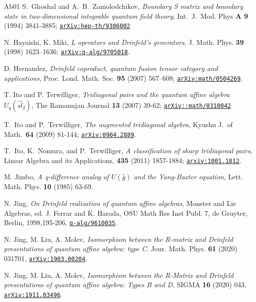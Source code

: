 \documentclass[11pt]{amsart}
\numberwithin{equation}{section}
\numberwithin{equation}{section}
\begin{document}
\begin{thebibliography}{Ab01}
S.\ Ghoshal and A.\ B.\ Zamolodchikov, \textit{Boundary S matrix and boundary state in two-dimensional integrable quantum field theory}, Int.\ J.\ Mod. Phys {\bf A 9} (1994) 3841-3885; \href{https://arxiv.org/abs/hep-th/9306002}{\tt arXiv:hep-th/9306002}

N. Hayaishi, K. Miki, {\it L operators and Drinfeld's generators}, J. Math. Phys. {\bf 39} (1998) 1623--1636;   \href{https://arxiv.org/abs/q-alg/9705018}{\tt arXiv:q-alg/9705018}.

D. Hernandez, {\it Drinfeld coproduct, quantum fusion tensor category and applications}, Proc.
Lond. Math. Soc. {\bf 95} (2007) 567–608;  \href{https://arxiv.org/abs/math/0504269}{\tt arXiv:math/0504269}.


%
T. Ito and P. Terwilliger, {\it Tridiagonal pairs and the quantum affine algebra $U_q(\widehat{sl}_2)$}, The Ramanujan Journal {\bf 13} (2007) 39-62;
\href{https://arxiv.org/abs/math/0310042}{\tt arXiv::math/0310042}

T.\ Ito and P.\ Terwilliger,  \textit{The augmented tridiagonal algebra}, Kyushu J.\ of Math.\ {\bf 64} (2009) 81-144; \href{https://arxiv.org/abs/0904.2889} {\tt arXiv:0904.2889}.

T.\ Ito, K.\ Nomura, and P.\ Terwilliger,  \textit{A classification of sharp tridiagonal pairs}, Linear Algebra and its Applications, {\bf 435} (2011) 1857-1884;  \href{https://arxiv.org/abs/1001.1812}
{\tt arxiv:1001.1812}.


M. Jimbo, {\it A q-difference analog of $U(\widehat{g})$ and the Yang-Baxter equation}, Lett. Math. Phys. {\bf 10} (1985) 63-69.



N. Jing, {\it On Drinfeld realization of quantum affine algebras}, Monster and Lie Algebras, ed. J. Ferrar and K. Harada, OSU Math Res Inst Publ. 7, de Gruyter, Berlin, 1998,195-206, \href{https://arxiv.org/abs/9610035} {\tt q-alg/9610035}.

N. Jing, M. Liu, A. Molev, {\it Isomorphism between the R-matrix and Drinfeld presentations of quantum affine algebra: type C}. Jour. Math. Phys. {\bf  61} (2020) 031701,  \href{https://arxiv.org/abs/1903.00204} {\tt arXiv:1903.00204}.

N. Jing, M. Liu, A. Molev, {\it Isomorphism between the R-Matrix and Drinfeld presentations of quantum affine algebra: Types B and D}, SIGMA {\bf 16} (2020) 043, \href{https://arxiv.org/abs/1911.03496} {\tt arXiv:1911.03496}.


\end{thebibliography}
\end{document}
